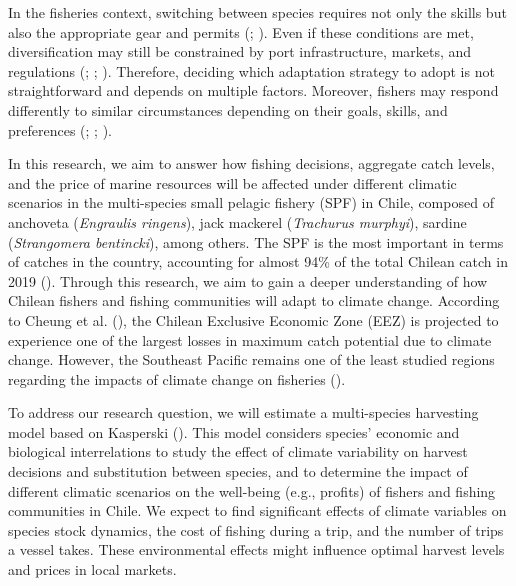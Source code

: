 \documentclass[
  11pt,
]{article}
\begin{document}
In the fisheries context, switching between species requires not only
the skills but also the appropriate gear and permits (; ). Even if these conditions are met, diversification may
still be constrained by port infrastructure, markets, and regulations
(; ; ). Therefore,
deciding which adaptation strategy to adopt is not straightforward and
depends on multiple factors. Moreover, fishers may respond differently
to similar circumstances depending on their goals, skills, and
preferences (; ; ).

In this research, we aim to answer how fishing decisions, aggregate
catch levels, and the price of marine resources will be affected under
different climatic scenarios in the multi-species small pelagic fishery
(SPF) in Chile, composed of anchoveta (\emph{Engraulis ringens}), jack
mackerel (\emph{Trachurus murphyi}), sardine (\emph{Strangomera bentincki}), among
others. The SPF is the most important in terms of catches in the
country, accounting for almost 94\% of the total Chilean catch in 2019
(). Through this research, we aim to gain a deeper
understanding of how Chilean fishers and fishing communities will adapt
to climate change. According to Cheung et al. (), the Chilean Exclusive
Economic Zone (EEZ) is projected to experience one of the largest losses
in maximum catch potential due to climate change.
However, the Southeast Pacific remains one of the least studied regions
regarding the impacts of climate change on fisheries ().

To address our research question, we will estimate a multi-species
harvesting model based on Kasperski (). This model considers
species' economic and biological interrelations to study the effect of
climate variability on harvest decisions and substitution between
species, and to determine the impact of different climatic scenarios on
the well-being (e.g., profits) of fishers and fishing communities in
Chile. We expect to find significant effects of climate variables on
species stock dynamics, the cost of fishing during a trip, and the
number of trips a vessel takes. These environmental effects might
influence optimal harvest levels and prices in local markets.
\end{document}
